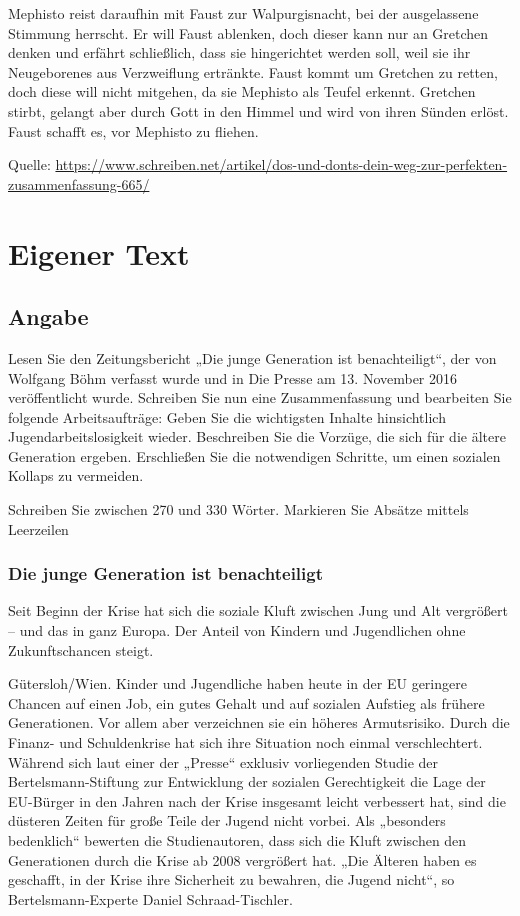 Mephisto reist daraufhin mit Faust zur Walpurgisnacht, bei der ausgelassene Stimmung herrscht. Er will Faust ablenken, doch dieser kann nur an Gretchen denken und erfährt schließlich, dass sie hingerichtet werden soll, weil sie ihr Neugeborenes aus Verzweiflung ertränkte. Faust kommt um Gretchen zu retten, doch diese will nicht mitgehen, da sie Mephisto als Teufel erkennt. Gretchen stirbt, gelangt aber durch Gott in den Himmel und wird von ihren Sünden erlöst. Faust schafft es, vor Mephisto zu fliehen. 

 

Quelle: \href{https://www.schreiben.net/artikel/dos-und-donts-dein-weg-zur-perfekten-zusammenfassung-665/ }{https://www.schreiben.net/artikel/dos-und-donts-dein-weg-zur-perfekten-zusammenfassung-665/ }



\section{Eigener Text}
\subsection{Angabe}
Lesen Sie den Zeitungsbericht „Die junge Generation ist benachteiligt“, der von Wolfgang Böhm verfasst wurde und in Die Presse am 13. November 2016 veröffentlicht wurde. Schreiben Sie nun eine Zusammenfassung und bearbeiten Sie folgende Arbeitsaufträge: Geben Sie die wichtigsten Inhalte hinsichtlich Jugendarbeitslosigkeit wieder. Beschreiben Sie die Vorzüge, die sich für die ältere Generation ergeben. Erschließen Sie die notwendigen Schritte, um einen sozialen Kollaps zu vermeiden.  

Schreiben Sie zwischen 270 und 330 Wörter. Markieren Sie Absätze mittels Leerzeilen 

\subsubsection{Die junge Generation ist benachteiligt}

Seit Beginn der Krise hat sich die soziale Kluft zwischen Jung und Alt vergrößert – und
das in ganz Europa. Der Anteil von Kindern und Jugendlichen ohne Zukunftschancen
steigt.

Gütersloh/Wien. Kinder und Jugendliche haben heute in der EU geringere Chancen auf einen
Job, ein gutes Gehalt und auf sozialen Aufstieg als frühere Generationen. Vor allem aber
verzeichnen sie ein höheres Armutsrisiko. Durch die Finanz- und Schuldenkrise hat sich ihre
Situation noch einmal verschlechtert. Während sich laut einer der „Presse“ exklusiv
vorliegenden Studie der Bertelsmann-Stiftung zur Entwicklung der sozialen Gerechtigkeit die
Lage der EU-Bürger in den Jahren nach der Krise insgesamt leicht verbessert hat, sind die
düsteren Zeiten für große Teile der Jugend nicht vorbei. Als „besonders bedenklich“ bewerten
die Studienautoren, dass sich die Kluft zwischen den Generationen durch die Krise ab 2008
vergrößert hat. „Die Älteren haben es geschafft, in der Krise ihre Sicherheit zu bewahren, die
Jugend nicht“, so Bertelsmann-Experte Daniel Schraad-Tischler.

